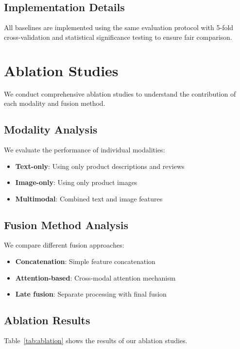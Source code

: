 \subsection{Implementation Details}
All baselines are implemented using the same evaluation protocol with 5-fold cross-validation and statistical significance testing to ensure fair comparison.

\section{Ablation Studies}

We conduct comprehensive ablation studies to understand the contribution of each modality and fusion method.

\subsection{Modality Analysis}
We evaluate the performance of individual modalities:
\begin{itemize}
    \item \textbf{Text-only}: Using only product descriptions and reviews
    \item \textbf{Image-only}: Using only product images
    \item \textbf{Multimodal}: Combined text and image features
\end{itemize}

\subsection{Fusion Method Analysis}
We compare different fusion approaches:
\begin{itemize}
    \item \textbf{Concatenation}: Simple feature concatenation
    \item \textbf{Attention-based}: Cross-modal attention mechanism
    \item \textbf{Late fusion}: Separate processing with final fusion
\end{itemize}

\subsection{Ablation Results}
Table~\ref{tab:ablation} shows the results of our ablation studies.


